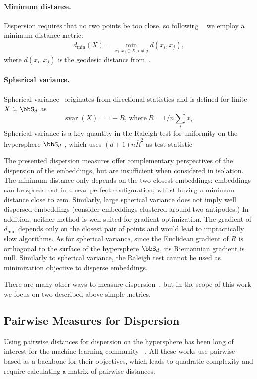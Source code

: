 \documentclass[10pt]{article} %
\newcommand\dmin{d_{\min}}
\begin{document}
\paragraph{Minimum distance.} 
Dispersion requires that no two points be too close, so following ~\cite{zhou2022learning} we employ a minimum distance metric:
\begin{equation}
    \label{eq:mindist}
    \dmin(X) = \min_{x_i,x_j \in X, i \neq j}d(x_i,x_j),
\end{equation}
where $d(x_i,x_j)$ is the geodesic distance from~.
\paragraph{Spherical variance.} Spherical variance~\citep{alma999052553502466,mardia1975statistics} originates from directional statistics and is defined for finite \(X \subseteq \bbS_d\) as 
\begin{equation}
    \label{eq:svar}
    \operatorname{svar}(X) = 1-\overline{R},~\text{where}~ \overline{R} = 1/n \sum_i x_i.
\end{equation}
Spherical variance is a key quantity in the Raleigh test for uniformity on the hypersphere \(\bbS_d\)~\citep[p. 206--208]{mardia-1999}, which uses 
\((d + 1) n \overline{R}^2\) as test statistic.

The presented dispersion measures offer complementary perspectives of the dispersion of the embeddings, but are insufficient when considered in isolation.
The minimum distance only depends on the two closest embeddings: embeddings can be spread out in a near perfect configuration, whilst having a minimum distance close to zero.
Similarly, large spherical variance does not imply well dispersed embeddings (consider embeddings clustered around two antipodes.)
In addition, neither method is well-suited for gradient optimization.
The gradient of \(\dmin\) depends only on the closest pair of points 
and would lead to impractically slow algorithms.
As for spherical variance,
since the Euclidean gradient of $\overline{R}$ is orthogonal to the surface of the hypersphere \(\bbS_d\), its Riemannian gradient is null. Similarly to spherical variance, the Raleigh test cannot be used as minimization objective to disperse embeddings.

There are many other ways to measure dispersion~\citep{marbut2023reliable}, but in the scope of this work we focus on two described above simple metrics. 

\subsection{Pairwise Measures for Dispersion}
Using pairwise distances for dispersion on the hypersphere has been long of interest for the machine learning community ~\citep{sablayrolles2018spreading,mettes2019hyperspherical,wang2020mmadispersion,Trosten-noHub-2023,liu2018learning,pmlr-v130-liu21d}. All these works use pairwise-based as a backbone for their objectives, which leads to quadratic complexity and require calculating a matrix of pairwise distances. 
\end{document}
